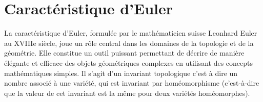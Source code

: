 \label{chap:annexes}

\chapter{Caractéristique d'Euler}

La caractéristique d'Euler, formulée par le mathématicien suisse Leonhard Euler au XVIIIe siècle, joue un rôle central dans les domaines de la topologie et de la géométrie. Elle constitue un outil puissant permettant de décrire de manière élégante et efficace des objets géométriques complexes en utilisant des concepts mathématiques simples. Il s'agit d'un invariant topologique c'est à dire un nombre associé à une variété, qui est invariant par homéomorphisme (c’est-à-dire que la valeur de cet invariant est la même pour deux variétés homéomorphes).
